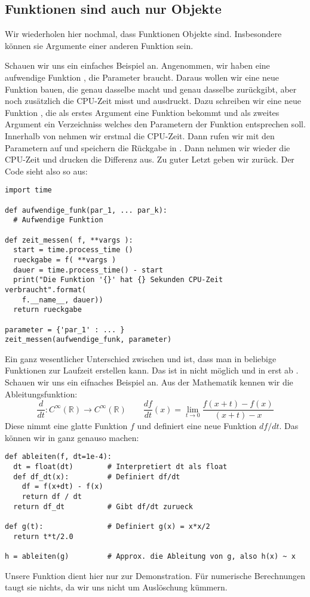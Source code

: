 \subsection{Funktionen sind auch nur Objekte}
\label{section:funktionen:funktionen_sind_objekte}
Wir wiederholen hier nochmal, dass Funktionen Objekte sind.
Insbesondere können sie Argumente einer anderen Funktion  sein.

Schauen wir uns ein einfaches Beispiel an.
Angenommen, wir haben eine aufwendige Funktion , die  Parameter braucht.
Daraus wollen wir eine neue Funktion bauen,
die genau dasselbe macht und genau dasselbe zurückgibt, aber noch zusätzlich die CPU-Zeit misst und ausdruckt.
Dazu schreiben wir eine neue Funktion , die als erstes Argument eine Funktion  bekommt
und als zweites Argument ein Verzeichniss  welches den Parametern der Funktion  entsprechen soll.
Innerhalb von  nehmen wir erstmal die CPU-Zeit.
Dann rufen wir  mit den Parametern  auf und speichern die Rückgabe in .
Dann nehmen wir wieder die CPU-Zeit und drucken die Differenz aus.
Zu guter Letzt geben wir  zurück.
Der Code sieht also so aus:
\begin{lstlisting}
import time

def aufwendige_funk(par_1, ... par_k):
  # Aufwendige Funktion

def zeit_messen( f, **vargs ):
  start = time.process_time ()
  rueckgabe = f( **vargs )
  dauer = time.process_time() - start
  print("Die Funktion '{}' hat {} Sekunden CPU-Zeit verbraucht".format(
    f.__name__, dauer))
  return rueckgabe

parameter = {'par_1' : ... }
zeit_messen(aufwendige_funk, parameter)
\end{lstlisting}

Ein ganz wesentlicher Unterschied zwischen \C und \Python ist, dass man in \Python beliebige Funktionen zur Laufzeit erstellen kann.
Das ist in \C nicht möglich und in \CPP erst ab \CPPElf.
Schauen wir uns ein eifnaches Beispiel an.
Aus der Mathematik kennen wir die Ableitungsfunktion:
\[
  \frac{d}{dt} \colon C^\infty(\mathbb R) \to C^\infty( \mathbb R) \quad\quad \frac{df}{dt}(x) = \lim_{t \to 0} \frac{f(x+t) - f(x)}{(x+t)-x}
\]
Diese nimmt eine glatte Funktion $f$ und definiert eine neue Funktion $df/dt$.
Das können wir in \Python ganz genauso machen:
\begin{lstlisting}
def ableiten(f, dt=1e-4):
  dt = float(dt)        # Interpretiert dt als float
  def df_dt(x):         # Definiert df/dt
    df = f(x+dt) - f(x)
    return df / dt
  return df_dt          # Gibt df/dt zurueck

def g(t):               # Definiert g(x) = x*x/2
  return t*t/2.0

h = ableiten(g)         # Approx. die Ableitung von g, also h(x) ~ x
\end{lstlisting}
Unsere Funktion  dient hier nur zur Demonstration.
Für numerische Berechnungen taugt sie nichts, da wir uns nicht um Auslöschung kümmern.

